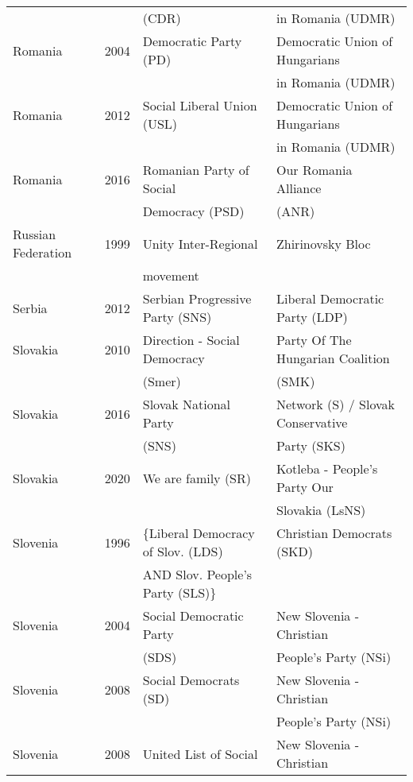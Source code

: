 {\begin{longtable}{|l|c|l|l|}
               &      &      (CDR)     &   in Romania (UDMR)  \\ 
   Romania & 2004 &   Democratic Party (PD) &   Democratic Union of Hungarians  \\ 
               &      &         &    in Romania (UDMR) \\ 
   Romania & 2012 &   Social Liberal Union (USL)   &   Democratic Union of Hungarians \\ 
               &      &         &   in Romania (UDMR)   \\ 
   Romania & 2016 &   Romanian Party of Social   &   Our Romania Alliance  \\ 
               &      &      Democracy (PSD)    &   (ANR)  \\ 
   Russian Federation & 1999 &   Unity Inter-Regional &   Zhirinovsky Bloc \\ 
               &      &      movement    &     \\ 
   Serbia & 2012 &   Serbian Progressive Party (SNS)   &   Liberal Democratic Party (LDP)   \\ 
   Slovakia & 2010 &   Direction - Social Democracy &   Party Of The Hungarian Coalition  \\ 
               &      &      (Smer)    &    (SMK) \\ 
   Slovakia & 2016 &   Slovak National Party &   Network (S) / Slovak Conservative   \\ 
               &      &      (SNS)    &    Party (SKS)  \\ 
   Slovakia & 2020 &   We are family (SR) &   Kotleba - People's Party Our    \\ 
               &      &         &  Slovakia (LsNS)   \\ 
   Slovenia & 1996 & $\lbrace$Liberal Democracy of Slov. (LDS)  &   Christian Democrats (SKD)   \\ 
    &   & AND Slov. People's Party (SLS)$\rbrace$&   \\ 
   Slovenia & 2004 &        Social Democratic Party &   New Slovenia - Christian    \\ 
               &      &      (SDS)    &    People's Party (NSi) \\ 
   Slovenia & 2008 &   Social Democrats (SD)  &   New Slovenia - Christian   \\ 
               &      &         &   People's Party (NSi)   \\ 
   Slovenia & 2008 &   United List of Social  &   New Slovenia - Christian   \\ 

\end{longtable}}
